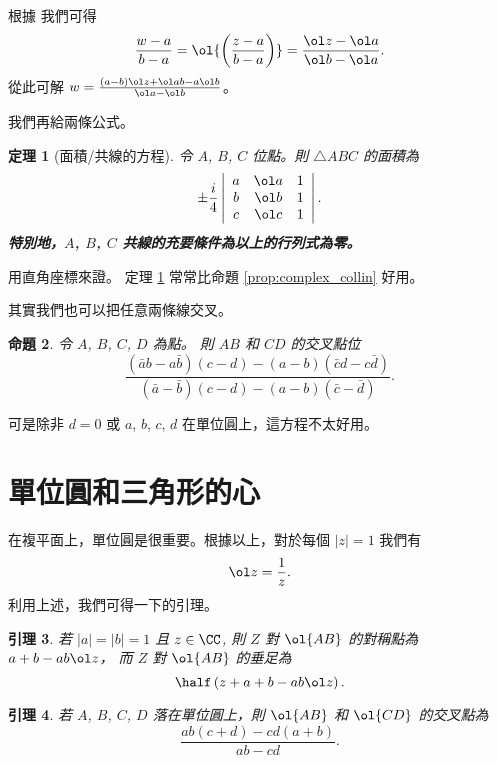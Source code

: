 \documentclass[11pt]{scrartcl}
\newtheorem{theorem}{\color{blue!40!black}定理}
\newtheorem{lemma}[theorem]{\color{blue!40!black}引理}
\newtheorem{proposition}[theorem]{\color{blue!40!black}命題}
\theoremstyle{definition}
\let\oldendproof\endproof
\renewenvironment{proof}[1][證]{%
  \oldproof[\bfseries 【#1】\nopunct]%
}{\oldendproof}
\begin{document}
\begin{proof}
  根據  我們可得
  \[ \frac{w-a}{b-a} = \ol{\left( \frac{z-a}{b-a} \right)} = \frac{\ol z - \ol a}{\ol b - \ol a}. \]
  從此可解 $w = \frac{(a-b)\ol z + \ol a b - a \ol b}{\ol a-  \ol b}$。
\end{proof}

我們再給兩條公式。

\begin{theorem}
  [面積/共線的方程] 令 $A$, $B$, $C$ 位點。則 $\triangle ABC$ 的面積為
  \[
    \pm \frac{i}{4}
    \left\lvert
    \begin{array}{ccc}
      a & \ol a & 1 \\
      b & \ol b & 1 \\
      c & \ol c & 1 \\
    \end{array}
    \right\rvert.
  \]
  \textbf{特別地，$A$, $B$, $C$ 共線的充要條件為以上的行列式為零。}
  \label{thm:complex_shoelace}
\end{theorem}
\begin{proof}
  用直角座標來證。
\end{proof}
定理 \ref{thm:complex_shoelace} 常常比命題 \ref{prop:complex_collin} 好用。

其實我們也可以把任意兩條線交叉。
\begin{proposition}
  令 $A$, $B$, $C$, $D$ 為點。 則 $AB$ 和 $CD$ 的交叉點位
  \[ \frac{ (\bar a b - a \bar b )(c-d) - (a-b)(\bar c d - c \bar d) }{(\bar a - \bar b )(c-d) - (a-b)(\bar c - \bar d)}. \]
  \label{prop:complex_intersect}
\end{proposition}
可是除非 $d=0$ 或 $a$, $b$, $c$, $d$ 在單位圓上，這方程不太好用。


\section{單位圓和三角形的心}
\label{sec:unitcircle}
在複平面上，單位圓是很重要。根據以上，對於每個 $\left\lvert z \right\rvert = 1$ 我們有 \[ \ol z = \frac 1z. \]
利用上述，我們可得一下的引理。

\begin{lemma}
  若 $ \left\lvert a \right\rvert = \left\lvert b \right\rvert = 1$ 且 $z \in \CC$, 則 $Z$ 對 $\ol{AB}$ 的對稱點為
  $a+b-ab \ol z$，
  而 $Z$ 對 $\ol{AB}$ 的垂足為
  \[ \half \left( z+a+b -ab \ol z \right). \]
\end{lemma}
\begin{lemma}
  若 $A$, $B$, $C$, $D$ 落在單位圓上，則 $\ol{AB}$ 和 $\ol{CD}$ 的交叉點為
  \[ \frac{ab(c+d)-cd(a+b)}{ab-cd}. \]
\end{lemma}
\end{document}
